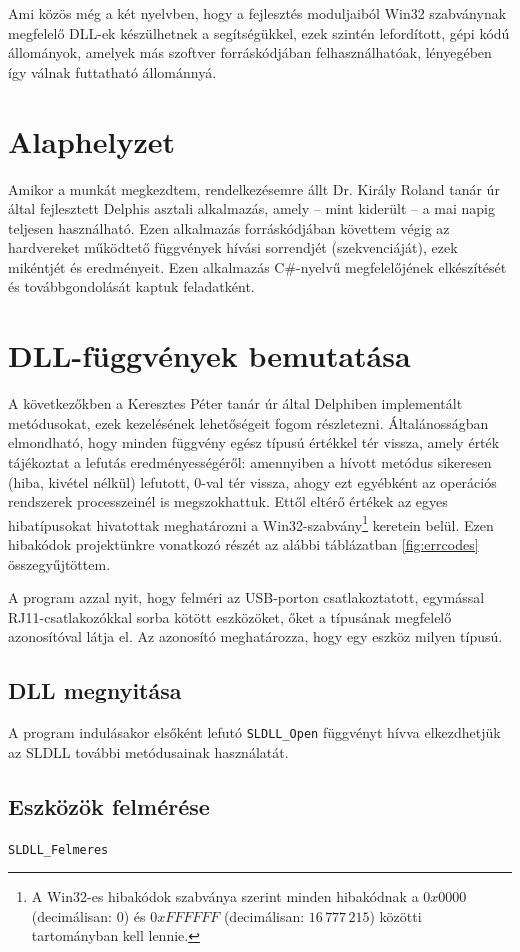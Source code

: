 \documentclass[tocnopagenum]{thesis-ekf}
\theoremstyle{definition}
\theoremstyle{remark}
\begin{document}
	Ami közös még a két nyelvben, hogy a fejlesztés moduljaiból Win32 szabványnak megfelelő DLL-ek készülhetnek a segítségükkel, ezek szintén lefordított, gépi kódú állományok, amelyek más szoftver forráskódjában felhasználhatóak, lényegében így válnak futtatható állománnyá.
	
	\section{Alaphelyzet}
	Amikor a munkát megkezdtem, rendelkezésemre állt Dr. Király Roland tanár úr által fejlesztett Delphis asztali alkalmazás, amely -- mint kiderült -- a mai napig teljesen használható. Ezen alkalmazás forráskódjában követtem végig az hardvereket működtető függvények hívási sorrendjét (szekvenciáját), ezek mikéntjét és eredményeit. Ezen alkalmazás C\#-nyelvű megfelelőjének elkészítését és továbbgondolását kaptuk feladatként.
	\section{DLL-függvények bemutatása}
	A következőkben a Keresztes Péter tanár úr által Delphiben implementált metódusokat, ezek kezelésének lehetőségeit fogom részletezni.
	Általánosságban elmondható, hogy minden függvény egész típusú értékkel tér vissza, amely érték tájékoztat a lefutás eredményességéről: amennyiben a hívott metódus sikeresen (hiba, kivétel nélkül) lefutott, 0-val tér vissza, ahogy ezt egyébként az operációs rendszerek processzeinél is megszokhattuk. Ettől eltérő értékek az egyes hibatípusokat hivatottak meghatározni a Win32-szabvány\footnote{A Win32-es hibakódok szabványa szerint minden hibakódnak a $0x0000$ (decimálisan: 0) és $0xFFFFFF$ (decimálisan: $16\,777\,215$) közötti tartományban kell lennie.} keretein belül. Ezen hibakódok projektünkre vonatkozó részét az alábbi táblázatban \ref{fig:errcodes} összegyűjtöttem.
	
	A program azzal nyit, hogy felméri az USB-porton csatlakoztatott, egymással RJ11-csatlakozókkal sorba kötött eszközöket, őket a típusának megfelelő azonosítóval látja el. Az azonosító meghatározza, hogy egy eszköz milyen típusú. 
	
	\subsection{DLL megnyitása}
	A program indulásakor elsőként lefutó \verb*|SLDLL_Open| függvényt hívva elkezdhetjük az SLDLL további metódusainak használatát.
	\subsection{Eszközök felmérése}
	\verb*|SLDLL_Felmeres|
\end{document}
